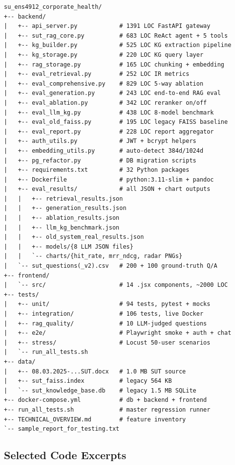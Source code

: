 \documentclass[11pt, a4paper]{article}
\begin{document}
\begin{itemize}[leftmargin=*]
\begin{lstlisting}[basicstyle=\ttfamily\scriptsize]
su_ens4912_corporate_health/
+-- backend/
|   +-- api_server.py            # 1391 LOC FastAPI gateway
|   +-- sut_rag_core.py          # 683 LOC ReAct agent + 5 tools
|   +-- kg_builder.py            # 525 LOC KG extraction pipeline
|   +-- kg_storage.py            # 220 LOC KG query layer
|   +-- rag_storage.py           # 165 LOC chunking + embedding
|   +-- eval_retrieval.py        # 252 LOC IR metrics
|   +-- eval_comprehensive.py    # 829 LOC 5-way ablation
|   +-- eval_generation.py       # 243 LOC end-to-end RAG eval
|   +-- eval_ablation.py         # 342 LOC reranker on/off
|   +-- eval_llm_kg.py           # 438 LOC 8-model benchmark
|   +-- eval_old_faiss.py        # 195 LOC legacy FAISS baseline
|   +-- eval_report.py           # 228 LOC report aggregator
|   +-- auth_utils.py            # JWT + bcrypt helpers
|   +-- embedding_utils.py       # auto-detect 384d/1024d
|   +-- pg_refactor.py           # DB migration scripts
|   +-- requirements.txt         # 32 Python packages
|   +-- Dockerfile               # python:3.11-slim + pandoc
|   +-- eval_results/            # all JSON + chart outputs
|   |   +-- retrieval_results.json
|   |   +-- generation_results.json
|   |   +-- ablation_results.json
|   |   +-- llm_kg_benchmark.json
|   |   +-- old_system_real_results.json
|   |   +-- models/{8 LLM JSON files}
|   |   `-- charts/{hit_rate, mrr_ndcg, radar PNGs}
|   `-- sut_questions(_v2).csv   # 200 + 100 ground-truth Q/A
+-- frontend/
|   `-- src/                     # 14 .jsx components, ~2000 LOC
+-- tests/
|   +-- unit/                    # 94 tests, pytest + mocks
|   +-- integration/             # 106 tests, live Docker
|   +-- rag_quality/             # 10 LLM-judged questions
|   +-- e2e/                     # Playwright smoke + auth + chat
|   +-- stress/                  # Locust 50-user scenarios
|   `-- run_all_tests.sh
+-- data/
|   +-- 08.03.2025-...SUT.docx   # 1.0 MB SUT source
|   +-- sut_faiss.index          # legacy 564 KB
|   `-- sut_knowledge_base.db    # legacy 1.5 MB SQLite
+-- docker-compose.yml           # db + backend + frontend
+-- run_all_tests.sh             # master regression runner
+-- TECHNICAL_OVERVIEW.md        # feature inventory
`-- sample_report_for_testing.txt
\end{lstlisting}

\subsection{Selected Code Excerpts}


\end{itemize}
\end{document}

